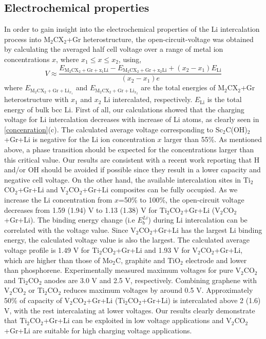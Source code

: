 \subsection{Electrochemical properties}

In order to gain insight into the electrochemical properties of the Li intercalation process into M$_2$CX$_2$+Gr heterostructure, the open-circuit-voltage was obtained by calculating the averaged half cell voltage over a range of metal ion concentrations $x$, where $x_1\leq x\leq x_2$, using,
\begin{equation}
V\approx\frac{E_{\mathrm{M}_2\mathrm{C}\mathrm{X}_2+\mathrm{Gr}+\mathrm{x_1Li}}-E_{\mathrm{M}_2\mathrm{C}\mathrm{X}_2+\mathrm{Gr}+\mathrm{x_2Li}}+(x_2-x_1)E_{\mathrm{Li}}}{(x_2-x_1)e}
\end{equation}
where $E_{\mathrm{M}_2\mathrm{C}\mathrm{X}_2+\mathrm{Gr}+\mathrm{Li}_{x_1}}$ and $E_{\mathrm{M}_2\mathrm{C}\mathrm{X}_2+\mathrm{Gr}+\mathrm{Li}_{x_2}}$ are the total energies of M$_2$CX$_2$+Gr heterostructure with $x_1$ and $x_2$ Li intercalated, respectively.  $E_{\mathrm{Li}}$ is the total energy of bulk bcc Li.  First of all, our calculations showed that the charging voltage for Li intercalation decreases with increase of Li atoms, as clearly seen in \autoref{concenration}(c). The calculated average voltage corresponding to Sc$_2$C(OH)$_2$+Gr+Li is negative for the Li ion concentration $x$ larger than 55\%. As mentioned above, a phase transition should be expected for the concentrations larger than this critical value. Our results are consistent with a recent work reporting that H and/or OH should be avoided if possible since they result in a lower capacity and negative cell voltage\cite{Xie2014,Tang2012}. On the other hand, the available intercalation sites in Ti$_2$CO$_2$+Gr+Li and V$_2$CO$_2$+Gr+Li composites can be fully occupied.
As we increase the Li concentration from $x$=50\% to 100\%, the open-circuit voltage decreases from 1.59 (1.94) V to 1.13 (1.38) V for Ti$_2$CO$_2$+Gr+Li (V$_2$CO$_2$+Gr+Li). The binding energy change (i.e $E_{b}^{Li}$) during Li intercalation can be correlated with the voltage value. Since V$_2$CO$_2$+Gr+Li has the largest Li binding energy, the calculated voltage value is also the largest. The calculated average voltage profile is 1.49 V for Ti$_2$CO$_2$+Gr+Li and 1.93 V for V$_2$CO$_2$+Gr+Li, which are higher than those of Mo$_2$C\cite{C6TA01918H}, graphite\cite{ceder4} and TiO$_2$ electrode \cite{tio2-voltage} and lower than phosphorene\cite{doi:10.1021/nl504336h}. Experimentally measured maximum voltages for pure V$_2$CO$_2$ and Ti$_2$CO$_2$ anodes are 3.0 V and 2.5 V, respectively\cite{doi:10.1021/ja405735d,gdgdgd}. Combining graphene with V$_2$CO$_2$ or Ti$_2$CO$_2$ reduces maximum voltages by around 0.5 V.  Approximately 50\% of capacity of V$_2$CO$_2$+Gr+Li (Ti$_2$CO$_2$+Gr+Li) is intercalated above 2 (1.6) V, with the rest intercalating at lower voltages. Our results clearly demonstrate that Ti$_2$CO$_2$+Gr+Li can be exploited in low voltage applications and V$_2$CO$_2$+Gr+Li are suitable for high charging voltage applications.

